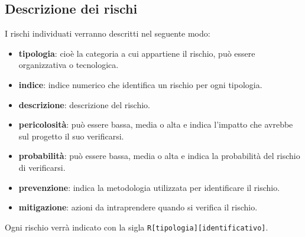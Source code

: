 \subsection{Descrizione dei rischi}
I rischi individuati verranno descritti nel seguente modo:
\begin{itemize}
    \item \textbf{tipologia}: cioè la categoria a cui appartiene il rischio, può essere organizzativa o tecnologica.
    \item \textbf{indice}: indice numerico che identifica un rischio per ogni tipologia.
    \item \textbf{descrizione}: descrizione del rischio.
    \item \textbf{pericolosità}: può essere bassa, media o alta e indica l'impatto che avrebbe sul progetto il suo verificarsi.
    \item \textbf{probabilità}: può essere bassa, media o alta e indica la probabilità del rischio di verificarsi.
    \item \textbf{prevenzione}: indica la metodologia utilizzata per identificare il rischio.
    \item \textbf{mitigazione}: azioni da intraprendere quando si verifica il rischio.   
\end{itemize}
Ogni rischio verrà indicato con la sigla \texttt{R[tipologia][identificativo]}.